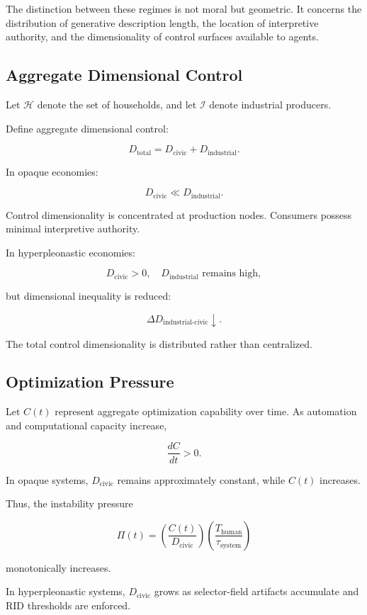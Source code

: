 \documentclass[11pt]{article}
\begin{document}
The distinction between these regimes is not moral but geometric. It
concerns the distribution of generative description length, the location
of interpretive authority, and the dimensionality of control surfaces
available to agents.

\subsection{Aggregate Dimensional Control}

Let $\mathcal{H}$ denote the set of households, and let 
$\mathcal{I}$ denote industrial producers.

Define aggregate dimensional control:

\[
D_{\text{total}} = D_{\text{civic}} + D_{\text{industrial}}.
\]

In opaque economies:

\[
D_{\text{civic}} \ll D_{\text{industrial}}.
\]

Control dimensionality is concentrated at production nodes.
Consumers possess minimal interpretive authority.

In hyperpleonastic economies:

\[
D_{\text{civic}} > 0,
\quad
D_{\text{industrial}} \text{ remains high},
\]

but dimensional inequality is reduced:

\[
\Delta D_{\text{industrial-civic}} \downarrow.
\]

The total control dimensionality is distributed rather than centralized.

\subsection{Optimization Pressure}

Let $C(t)$ represent aggregate optimization capability over time.
As automation and computational capacity increase,

\[
\frac{dC}{dt} > 0.
\]

In opaque systems, $D_{\text{civic}}$ remains approximately constant,
while $C(t)$ increases.

Thus, the instability pressure

\[
\Pi(t) =
\left( \frac{C(t)}{D_{\text{civic}}} \right)
\left( \frac{T_{\text{human}}}{\tau_{\text{system}}} \right)
\]

monotonically increases.

In hyperpleonastic systems, $D_{\text{civic}}$ grows as selector-field
artifacts accumulate and RID thresholds are enforced.
\end{document}
